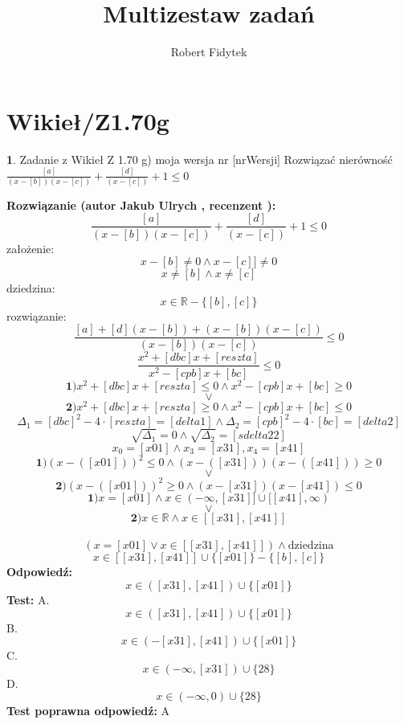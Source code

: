 \documentclass[12pt, a4paper]{article}
\title{Multizestaw zadań}
\author{Robert Fidytek}
\date{}
\theoremstyle{definition} %
\newtheorem{zad}{}
\newcommand{\kategoria}[1]{\section{#1}} %
\newcommand{\zadStart}[1]{\begin{zad}#1\newline} %
\newcommand{\zadStop}{\end{zad}}   %
\newcommand{\rozwStart}[2]{\noindent \textbf{Rozwiązanie (autor #1 , recenzent #2): }\newline} %
\newcommand{\rozwStop}{\newline}                                            %
\newcommand{\odpStart}{\noindent \textbf{Odpowiedź:}\newline}    %
\newcommand{\odpStop}{\newline}                                             %
\newcommand{\testStart}{\noindent \textbf{Test:}\newline} %
\newcommand{\testStop}{\newline} %
\newcommand{\kluczStart}{\noindent \textbf{Test poprawna odpowiedź:}\newline} %
\newcommand{\kluczStop}{\newline} %
\begin{document}
\maketitle


\kategoria{Wikieł/Z1.70g}
\zadStart{Zadanie z Wikieł Z 1.70 g) moja wersja nr [nrWersji]}
Rozwiązać nierówność $\frac{[a]}{(x-[b])(x-[c])}+\frac{[d]}{(x-[c])}+1\leq0$
\zadStop
\rozwStart{Jakub Ulrych}{}
$$\frac{[a]}{(x-[b])(x-[c])}+\frac{[d]}{(x-[c])}+1\leq0$$
założenie: $$x-[b]\neq0\land x-[c]]\neq0$$
$$x\neq[b]\land x\neq[c]$$
dziedzina:$$x\in \mathbb{R}-\{[b],[c]\}$$
rozwiązanie:$$\frac{[a]+[d](x-[b])+(x-[b])(x-[c])}{(x-[b])(x-[c])}\leq0$$
$$\frac{x^{2}+[dbc]x+[reszta]}{x^{2}-[cpb]x+[bc]}\leq0$$
$$\textbf{1)}x^{2}+[dbc]x+[reszta]\leq0 \land x^{2}-[cpb]x+[bc]\geq0$$ $$\vee$$ $$\textbf{2)}x^{2}+[dbc]x+[reszta]\geq0 \land x^{2}-[cpb]x+[bc]\leq0$$
$$\Delta_{1}=[dbc]^{2}-4\cdot[reszta]=[delta1] \land \Delta_{2}=[cpb]^{2}-4\cdot [bc]=[delta2]$$
$$\sqrt{\Delta_{1}}=0 \land \sqrt{\Delta_{2}}=[sdelta22]$$
$$x_{0}=[x01]\land x_{3}=[x31],x_{4}=[x41]$$
$$\textbf{1)}(x-([x01]))^{2}\leq0 \land (x-([x31]))(x-([x41]))\geq0$$ $$\vee$$ $$\textbf{2)}(x-([x01]))^{2}\geq0 \land (x-[x31])(x-[x41])\leq0$$
$$\textbf{1)}x=[x01]\land x\in(-\infty,[x31]]\cup [[x41],\infty)$$ $$\vee$$ $$\textbf{2)}x\in\mathbb{R}\land x\in[[x31],[x41]]$$
\\$$(x=[x01] \vee x\in[[x31],[x41]])\land\text{dziedzina}$$
$$x\in[[x31],[x41]]\cup \{[x01]\}-\{[b],[c]\}$$
\rozwStop
\odpStart
$$x\in([x31],[x41])\cup \{[x01]\}$$
\odpStop
\testStart
A.$$x\in([x31],[x41])\cup \{[x01]\}$$
B.$$x\in(-[x31],[x41])\cup \{[x01]\}$$
C.$$x\in(-\infty,[x31])\cup\{28\}$$
D.$$x\in(-\infty,0)\cup\{28\}$$
\testStop
\kluczStart
A
\kluczStop
\end{document}
